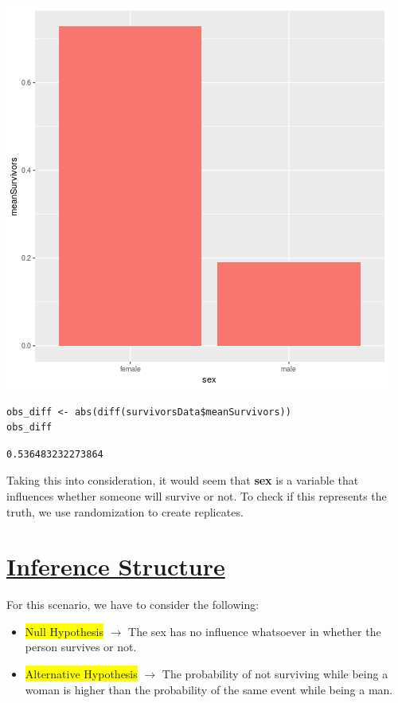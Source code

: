 \documentclass[11pt]{article}
\begin{document}
\begin{center}
\includegraphics[width=.9\linewidth]{simpleCorrelation.png}
\end{center}

\begin{verbatim}
obs_diff <- abs(diff(survivorsData$meanSurvivors))
obs_diff
\end{verbatim}

\begin{verbatim}
0.536483232273864
\end{verbatim}


Taking this into consideration, it would seem that \textbf{sex} is a variable that influences whether someone will survive or not. To check if this represents the truth, we use randomization to create replicates.  

\section{\underline{Inference Structure}}
\label{sec:orgda2420c}

For this scenario, we have to consider the following:

\begin{itemize}
\item \colorbox{yellow}{Null Hypothesis} \(\to\) The sex has no influence whatsoever in whether the person survives or not.

\item \colorbox{yellow}{Alternative Hypothesis} \(\to\) The probability of not surviving while being a woman is higher than the probability of the same event while being a man.
\end{itemize}
\end{document}

